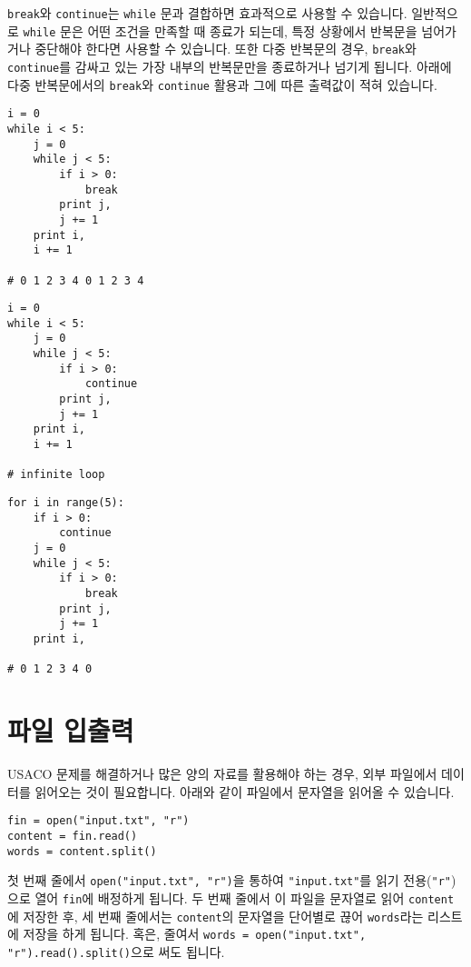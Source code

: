 \documentclass[../main.tex]{subfiles}
\begin{document}
\texttt{break}와 \texttt{continue}는 \texttt{while} 문과 결합하면 효과적으로 사용할 수 있습니다.
일반적으로 \texttt{while} 문은 어떤 조건을 만족할 때 종료가 되는데, 특정 상황에서 반복문을 넘어가거나 중단해야 한다면 사용할 수 있습니다.
또한 다중 반복문의 경우, \texttt{break}와 \texttt{continue}를 감싸고 있는 가장 내부의 반복문만을 종료하거나 넘기게 됩니다.
아래에 다중 반복문에서의 \texttt{break}와 \texttt{continue} 활용과 그에 따른 출력값이 적혀 있습니다.
\begin{verbatim}
i = 0
while i < 5:
    j = 0
    while j < 5:
        if i > 0:
            break
        print j,
        j += 1
    print i,
    i += 1

# 0 1 2 3 4 0 1 2 3 4
\end{verbatim}
\begin{verbatim}
i = 0
while i < 5:
    j = 0
    while j < 5:
        if i > 0:
            continue
        print j,
        j += 1
    print i,
    i += 1

# infinite loop
\end{verbatim}
\begin{verbatim}
for i in range(5):
    if i > 0:
        continue
    j = 0
    while j < 5:
        if i > 0:
            break
        print j,
        j += 1
    print i,

# 0 1 2 3 4 0
\end{verbatim}

\section{파일 입출력}
USACO 문제를 해결하거나 많은 양의 자료를 활용해야 하는 경우, 외부 파일에서 데이터를 읽어오는 것이 필요합니다.
아래와 같이 파일에서 문자열을 읽어올 수 있습니다.
\begin{verbatim}
fin = open("input.txt", "r")
content = fin.read()
words = content.split()
\end{verbatim}
첫 번째 줄에서 \texttt{open("input.txt", "r")}을 통하여 \texttt{"input.txt"}를 읽기 전용(\texttt{"r"})으로 열어 \texttt{fin}에 배정하게 됩니다.
두 번째 줄에서 이 파일을 문자열로 읽어 \texttt{content}에 저장한 후, 세 번째 줄에서는 \texttt{content}의 문자열을 단어별로 끊어 \texttt{words}라는 리스트에 저장을 하게 됩니다.
혹은, 줄여서 \texttt{words = open("input.txt", "r").read().split()}으로 써도 됩니다.
\end{document}
